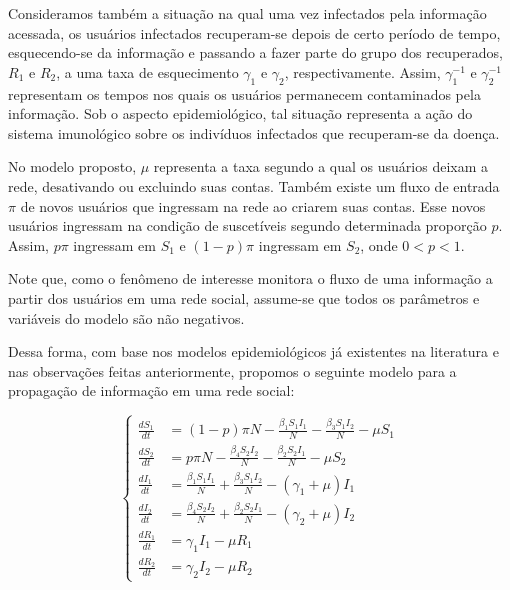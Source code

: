 \documentclass[
	12pt,				%
	openright,			%
	oneside,			%
	a4paper,			%
	english,			%
	french,				%
	spanish,			%
	brazil				%
	]{abntex2}
\begin{document}
Consideramos também a situação na qual uma vez infectados pela
informação acessada, os usuários infectados recuperam-se depois de
certo período de tempo, esquecendo-se da informação e passando a fazer
parte do grupo dos recuperados, $R_1$ e $R_2$, a uma taxa de
esquecimento $\gamma_1$ e $\gamma_2$, respectivamente. Assim,
$\gamma_1^{-1}$ e $\gamma_2^{-1}$ representam os tempos nos quais os usuários
permanecem contaminados pela informação. Sob o aspecto epidemiológico,
tal situação representa a ação do sistema imunológico sobre os
indivíduos infectados que recuperam-se da doença.

No modelo proposto, $\mu$ representa a taxa segundo a qual os usuários
deixam a rede, desativando ou excluindo suas contas. Também existe um
fluxo de entrada $\pi$ de novos usuários que ingressam na rede ao
criarem suas contas. Esse novos usuários ingressam na condição de
suscetíveis segundo determinada proporção $p$. Assim, $p\pi$ ingressam
em $S_1$ e $(1-p)\pi$ ingressam em $S_2$, onde $0 < p < 1$.

Note que, como o fenômeno de interesse monitora o fluxo de uma
informação a partir dos usuários em uma rede social, assume-se que
todos os parâmetros e variáveis do modelo são não negativos.

Dessa forma, com base nos modelos epidemiológicos já existentes na
literatura e nas observações feitas anteriormente, propomos o seguinte
modelo para a propagação de informação em uma rede social:

\begin{equation*}
  \left\{ \begin{aligned}
  \frac{dS_1}{dt} &= (1-p)\pi N - \frac{\beta_1 S_1 I_1}{N} - \frac{\beta_3 S_1 I_2}{N} - \mu S_1 \nonumber \\
  \frac{dS_2}{dt} &= p\pi N - \frac{\beta_4 S_2 I_2}{N} - \frac{\beta_2 S_2 I_1}{N} - \mu S_2 \nonumber \\
  \frac{dI_1}{dt} &= \frac{\beta_1 S_1 I_1}{N} + \frac{\beta_3 S_1 I_2}{N} - (\gamma_1 + \mu)I_1 \nonumber \\
  \frac{dI_2}{dt} &= \frac{\beta_4 S_2 I_2}{N} + \frac{\beta_2 S_2 I_1}{N} - (\gamma_2 + \mu)I_2 \nonumber \\
  \frac{dR_1}{dt} &= \gamma_1 I_1 - \mu R_1 \nonumber \\
  \frac{dR_2}{dt} &= \gamma_2 I_2 - \mu R_2 \nonumber
  \end{aligned}
  \right.
\end{equation*}
\end{document}
